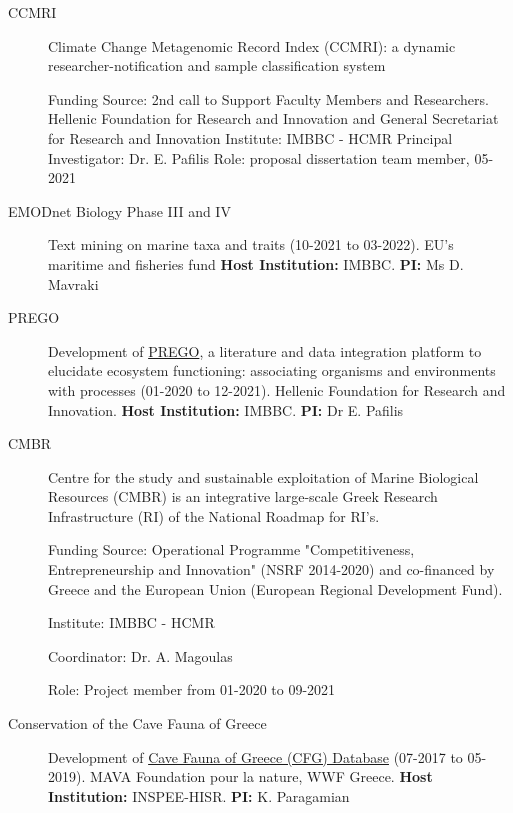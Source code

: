 \begin{description}

    \item[CCMRI] Climate Change Metagenomic Record Index (CCMRI): a dynamic researcher-notification and sample classification system
  
    Funding Source: 2nd call to Support Faculty Members and Researchers. Hellenic Foundation for Research and Innovation and General Secretariat for Research and Innovation
    Institute: IMBBC - HCMR
    Principal Investigator: Dr. E. Pafilis
    Role: proposal dissertation team member, 05- 2021
    

    \item[EMODnet Biology Phase III and IV] Text mining on marine taxa and traits (10-2021 to 03-2022). EU's maritime and fisheries fund
        \textbf{Host Institution:} IMBBC.
        \textbf{PI:} Ms D. Mavraki

    \item[PREGO]
        Development of \textcolor{teal}{\href{http://prego.hcmr.gr/}{PREGO}}, a literature and data integration platform to elucidate ecosystem functioning:
        associating organisms and environments with processes (01-2020 to 12-2021).
        Hellenic Foundation for Research and Innovation.
        \textbf{Host Institution:} IMBBC.
        \textbf{PI:} Dr E. Pafilis

    \item[CMBR] Centre for the study and sustainable exploitation of Marine Biological Resources (CMBR) is an integrative large-scale Greek Research Infrastructure (RI) of the National Roadmap for RI’s.

    Funding Source: Operational Programme "Competitiveness, Entrepreneurship and Innovation" (NSRF 2014-2020) and co-financed by Greece and the European Union (European Regional Development Fund).

    Institute: IMBBC - HCMR

    Coordinator: Dr. A. Magoulas

    Role: Project member from 01-2020 to 09-2021

    \item[Conservation of the Cave Fauna of Greece]
        Development of \textcolor{teal}{\href{https://database.inspee.gr/}{Cave Fauna of Greece (CFG) Database}} (07-2017 to 05-2019). 
        MAVA Foundation pour la nature, WWF Greece.
        \textbf{Host Institution:} INSPEE-HISR. 
        \textbf{PI:} K. Paragamian


\end{description}
